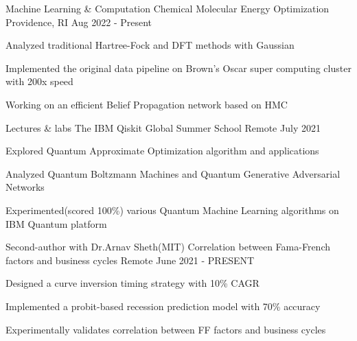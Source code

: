 \begin{cventries}
  \cventry
    {Machine Learning \& Computation}
    {Chemical Molecular Energy Optimization}
    {Providence, RI}
    {Aug 2022 - Present}
    {
      \begin{cvitems}
        \item {Analyzed traditional Hartree-Fock and DFT methods with Gaussian}
        \item {Implemented the original data pipeline on Brown's Oscar super computing cluster with 200x speed}
        \item {Working on an efficient Belief Propagation network based on HMC}
      \end{cvitems}
    }

  \cventry
    {Lectures \& labs}
    {The IBM Qiskit Global Summer School}
    {Remote}
    {July 2021}
    {
      \begin{cvitems}
        \item {Explored Quantum Approximate Optimization algorithm and applications}
        \item {Analyzed Quantum Boltzmann Machines and Quantum Generative Adversarial Networks}
        \item {Experimented(scored 100\%) various Quantum Machine Learning algorithms on IBM Quantum platform}
      \end{cvitems}
    }

  \cventry
    {Second-author with Dr.Arnav Sheth(MIT)}
    {Correlation between Fama-French factors and business cycles}
    {Remote}
    {June 2021 - PRESENT}
    {
      \begin{cvitems}
        \item {Designed a curve inversion timing strategy with 10\% CAGR}
        \item {Implemented a probit-based recession prediction model with 70\% accuracy}
        \item {Experimentally validates correlation between FF factors and business cycles}
      \end{cvitems}
    }


\end{cventries}

